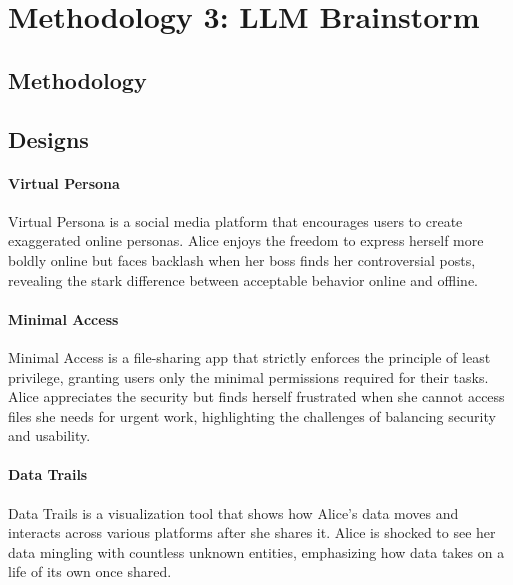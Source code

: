 
\section{Methodology 3: LLM Brainstorm}

\subsection{Methodology}

\subsection{Designs}

\paragraph{Virtual Persona} 
Virtual Persona is a social media platform that encourages users to create exaggerated online personas. Alice enjoys the freedom to express herself more boldly online but faces backlash when her boss finds her controversial posts, revealing the stark difference between acceptable behavior online and offline.

\paragraph{Minimal Access}
Minimal Access is a file-sharing app that strictly enforces the principle of least privilege, granting users only the minimal permissions required for their tasks. Alice appreciates the security but finds herself frustrated when she cannot access files she needs for urgent work, highlighting the challenges of balancing security and usability.

\paragraph{Data Trails}
Data Trails is a visualization tool that shows how Alice's data moves and interacts across various platforms after she shares it. Alice is shocked to see her data mingling with countless unknown entities, emphasizing how data takes on a life of its own once shared.

